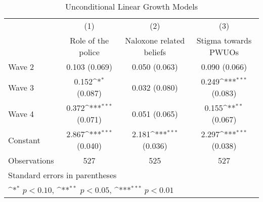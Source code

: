 \begin{table}[htbp]\centering
\def\sym#1{\ifmmode^{#1}\else\(^{#1}\)\fi}
\caption{\centering Unconditional Linear Growth Models}
\begin{tabular}{l*{3}{c}}
\toprule
                &\multicolumn{1}{c}{(1)}&\multicolumn{1}{c}{(2)}&\multicolumn{1}{c}{(3)}\\
                &\multicolumn{1}{c}{Role of the police}&\multicolumn{1}{c}{Naloxone related beliefs}&\multicolumn{1}{c}{Stigma towards PWUOs}\\
\midrule
Wave 2          &0.103 (0.069)         &0.050 (0.063)         &0.090 (0.066)         \\
\addlinespace
Wave 3          &0.152\sym{*} (0.087)         &0.032 (0.080)         &0.249\sym{***} (0.083)         \\
\addlinespace
Wave 4          &0.372\sym{***} (0.071)         &0.051 (0.065)         &0.155\sym{**} (0.067)         \\
\addlinespace
Constant        &2.867\sym{***} (0.040)         &2.181\sym{***} (0.036)         &2.297\sym{***} (0.038)         \\
\midrule
Observations    &      527         &      525         &      527         \\
\bottomrule
\multicolumn{4}{l}{\footnotesize Standard errors in parentheses}\\
\multicolumn{4}{l}{\footnotesize \sym{*} \(p<0.10\), \sym{**} \(p<0.05\), \sym{***} \(p<0.01\)}\\
\end{tabular}
\end{table}
